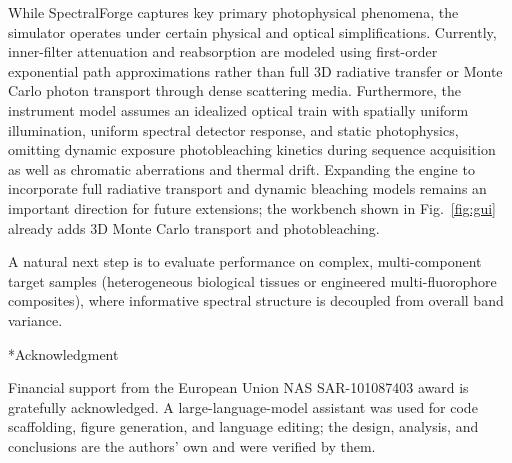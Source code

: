 \documentclass{article}
\makeatletter
\renewcommand\section{\@startsection{section}{1}{\z@}{9pt}{4pt}{\normalfont\bfseries}}
\makeatother
\begin{document}
While SpectralForge captures key primary photophysical phenomena, the simulator operates
under certain physical and optical simplifications. Currently, inner-filter attenuation and
reabsorption are modeled using first-order exponential path approximations rather than full
3D radiative transfer or Monte Carlo photon transport through dense scattering media.
Furthermore, the instrument model assumes an idealized optical train with spatially uniform
illumination, uniform spectral detector response, and static photophysics, omitting dynamic
exposure photobleaching kinetics during sequence acquisition as well as chromatic
aberrations and thermal drift. Expanding the engine to incorporate full radiative transport
and dynamic bleaching models remains an important direction for future extensions; the workbench shown in Fig.~\ref{fig:gui} already adds 3D Monte Carlo transport and photobleaching.

A natural next step is to evaluate performance on complex, multi-component target samples
(heterogeneous biological tissues or engineered multi-fluorophore composites), where informative spectral structure is decoupled from overall band variance.

\section*{Acknowledgment}
{\setlength{\emergencystretch}{2em}Financial support from the European Union NAS SAR-101087403 award is gratefully acknowledged. A large-language-model assistant was
used for code scaffolding, figure generation, and language editing; the design,
analysis, and conclusions are the authors' own and were verified by them.\par}
\end{document}
